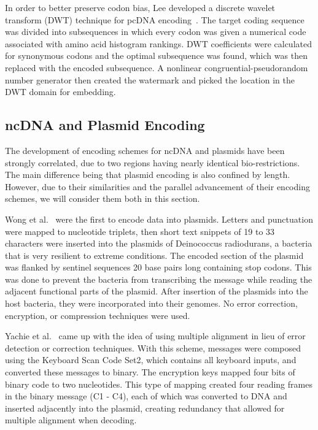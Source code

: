 \documentclass[USenglish,oneside,twocolumn]{article}
\begin{document}
In order to better preserve codon bias, Lee developed a discrete wavelet transform (DWT) technique for pcDNA encoding~\cite{L2014IS}. The target coding sequence was divided into subsequences in which every codon was given a numerical code associated with amino acid histogram rankings. DWT coefficients were calculated for synonymous codons and the optimal subsequence was found, which was then replaced with the encoded subsequence. A nonlinear congruential-pseudorandom number generator then created the watermark and picked the location in the DWT domain for embedding.

\subsection{ncDNA and Plasmid Encoding}

The development of encoding schemes for ncDNA and plasmids have been strongly correlated, due to two regions having nearly identical bio-restrictions. The main difference being that plasmid encoding is also confined by length. However, due to their similarities and the parallel advancement of their encoding schemes, we will consider them both in this section.

Wong et al.~\cite{WWF2003COTACM} were the first to encode data into plasmids. Letters and punctuation were mapped to nucleotide triplets, then short text snippets of 19 to 33 characters were inserted into the plasmids of Deinococcus radiodurans, a bacteria that is very resilient to extreme conditions. The encoded section of the plasmid was flanked by sentinel sequences 20 base pairs long containing stop codons. This was done to prevent the bacteria from transcribing the message while reading the adjacent functional parts of the plasmid. After insertion of the plasmids into the host bacteria, they were incorporated into their genomes. No error correction, encryption, or compression techniques were used.

Yachie et al.~\cite{YSSOT2007BP} came up with the idea of using multiple alignment in lieu of error detection or correction techniques. With this scheme, messages were composed using the Keyboard Scan Code Set2, which contains all keyboard inputs, and converted these messages to binary. The encryption keys mapped four bits of binary code to two nucleotides. This type of mapping created four reading frames in the binary message (C1 - C4), each of which was converted to DNA and inserted adjacently into the plasmid, creating redundancy that allowed for multiple alignment when decoding.
\end{document}
